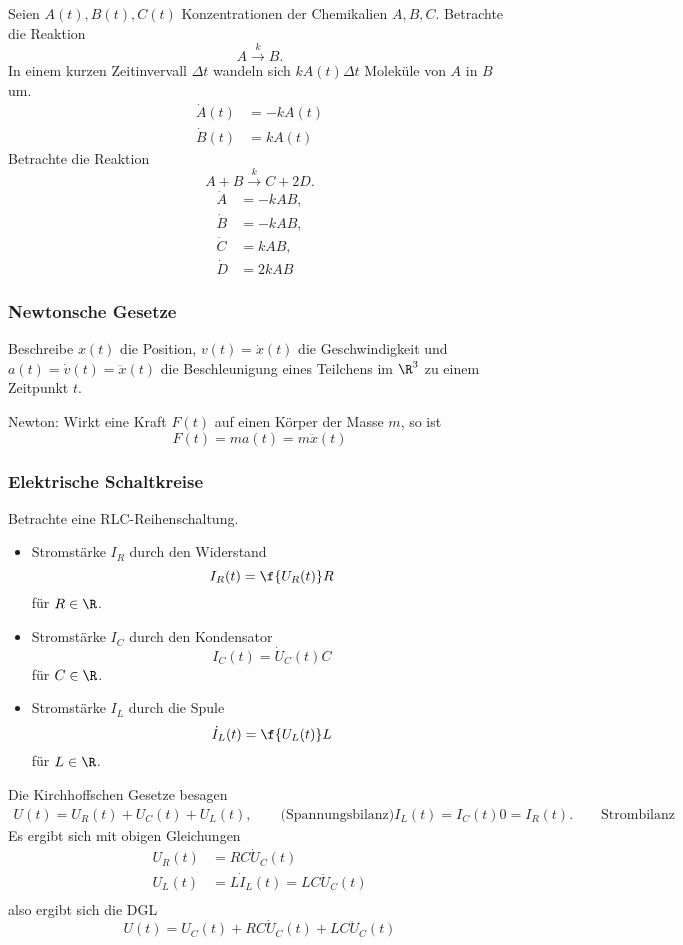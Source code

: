 \documentclass[
]{mycourse}
\begin{document}
Seien $A(t), B(t), C(t)$ Konzentrationen der Chemikalien $A,B,C$.
Betrachte die Reaktion
\[
	A \overset{k}{\longrightarrow} B.
\]
In einem kurzen Zeitinvervall $\Delta t$ wandeln sich $k A(t) \Delta t$ Moleküle von $A$ in $B$ um.
\begin{align*}
	\dot A(t) &= -k A(t) \\
	\dot B(t) &= k A(t)
\end{align*}
Betrachte die Reaktion
\[
	A + B \overset{k}{\longrightarrow} C + 2D.
\]
\begin{align*}
	\dot A &= -kAB,  \\
	\dot B &= -kAB, \\
	\dot C &= kAB, \\
	\dot D &= 2kAB
\end{align*}


\subsubsection{Newtonsche Gesetze}

\fixme[Bild]

Beschreibe $x(t)$ die Position, $v(t) = \dot x(t)$ die Geschwindigkeit und $a(t) = \dot v(t) = \ddot x(t)$ die Beschleunigung eines Teilchens im $\R^3$ zu einem Zeitpunkt $t$.

Newton: Wirkt eine Kraft $F(t)$ auf einen Körper der Masse $m$, so ist
\[
	F(t) = m a(t) = m\ddot x(t)
\]


\subsubsection{Elektrische Schaltkreise}


Betrachte eine RLC-Reihenschaltung.
\begin{itemize}
	\item
		Stromstärke $I_R$ durch den Widerstand
		\[
			I_R(t) = \f {U_R(t)}R
		\]
		für $R \in \R$.
	\item
		Stromstärke $I_C$ durch den Kondensator
		\[
			I_C(t) = \dot  U_C(t) C
		\]
		für $C \in \R$.
	\item
		Stromstärke $I_L$ durch die Spule
		\[
			\dot I_L(t) = \f {U_L(t)}L
		\]
		für $L \in \R$.
\end{itemize}

Die Kirchhoffschen Gesetze besagen
\begin{gather*}
	U(t) = U_R(t) + U_C(t) + U_L(t), \qquad \text{(Spannungsbilanz)}
	I_L(t) =  I_C(t)0= I_R(t). \qquad \text{Strombilanz}
\end{gather*}
Es ergibt sich mit obigen Gleichungen
\begin{align*}
	U_R(t) &= RC \dot U_C(t) \\
	U_L(t) &= L \dot I_L(t) = LC \ddot U_C(t) \\
\end{align*}
also ergibt sich die DGL
\[
	U(t) = U_C(t) + RC \dot U_C(t) + LC \ddot U_C(t)
\]
\end{document}
